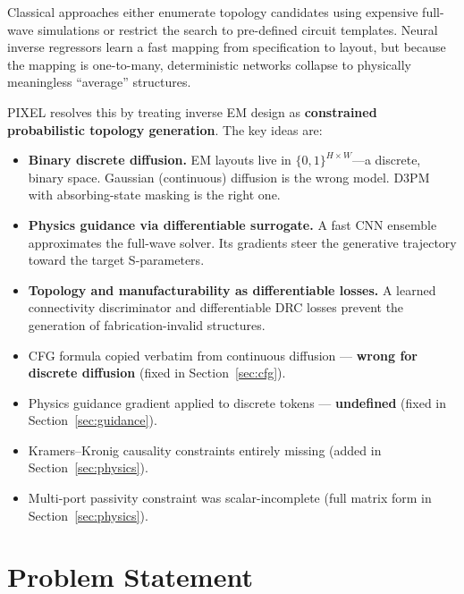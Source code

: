 \documentclass[12pt,a4paper]{article}
\theoremstyle{definition}
\theoremstyle{plain}
\theoremstyle{remark}
\begin{document}
Classical approaches either enumerate topology candidates using expensive full-wave
simulations or restrict the search to pre-defined circuit templates.
Neural inverse regressors learn a fast mapping from specification to layout, but because
the mapping is one-to-many, deterministic networks collapse to physically meaningless
``average'' structures.

\medskip
PIXEL resolves this by treating inverse EM design as \textbf{constrained probabilistic
topology generation}.
The key ideas are:

\begin{itemize}
  \item \textbf{Binary discrete diffusion.}
        EM layouts live in $\{0,1\}^{H \times W}$—a discrete, binary space.
        Gaussian (continuous) diffusion is the wrong model.
        D3PM with absorbing-state masking is the right one.
  \item \textbf{Physics guidance via differentiable surrogate.}
        A fast CNN ensemble approximates the full-wave solver.
        Its gradients steer the generative trajectory toward the target S-parameters.
  \item \textbf{Topology and manufacturability as differentiable losses.}
        A learned connectivity discriminator and differentiable DRC losses prevent the
        generation of fabrication-invalid structures.
\end{itemize}

\begin{tcolorbox}[notebox, title=Critical Corrections from V1]
\begin{itemize}
  \item CFG formula copied verbatim from continuous diffusion — \textbf{wrong for discrete
        diffusion} (fixed in Section~\ref{sec:cfg}).
  \item Physics guidance gradient applied to discrete tokens — \textbf{undefined} (fixed in
        Section~\ref{sec:guidance}).
  \item Kramers--Kronig causality constraints entirely missing (added in
        Section~\ref{sec:physics}).
  \item Multi-port passivity constraint was scalar-incomplete (full matrix form in
        Section~\ref{sec:physics}).
\end{itemize}
\end{tcolorbox}

\section{Problem Statement}
\label{sec:problem}
\end{document}
